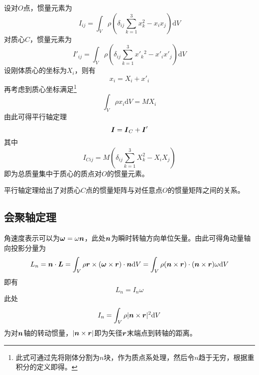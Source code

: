 设对$O$点，惯量元素为
\begin{equation*}
	I_{ij} = \int_V \rho \left(\delta_{ij}\sum_{k=1}^3 x_k^2-x_ix_j\right) \mathrm{d} V
\end{equation*}
对质心$C$，惯量元素为
\begin{equation*}
	I'_{ij} = \int_V \rho \left(\delta_{ij}\sum_{k=1}^3 x'_k{}^2-x'_ix'_j\right) \mathrm{d} V
\end{equation*}
设刚体质心的坐标为$X_i$，则有
\begin{equation*}
	x_i = X_i + x'_i
\end{equation*}
再考虑到质心坐标满足\footnote{此式可通过先将刚体分割为$n$块，作为质点系处理，然后令$n$趋于无穷，根据重积分的定义即得。}
\begin{equation*}
	\int_V \rho x_i \mathrm{d} V = MX_i
\end{equation*}
由此可得{\heiti 平行轴定理}
\begin{equation}
	\boldsymbol{I} = \boldsymbol{I}_C + \boldsymbol{I}'
\end{equation}
其中
\begin{equation}
	I_{Cij} = M\left(\delta_{ij}\sum_{k=1}^3 X_k^2-X_iX_j\right)
\end{equation}
即为总质量集中于质心的质点对$O$的惯量元素。

平行轴定理给出了对质心$C$点的惯量矩阵与对任意点$O$的惯量矩阵之间的关系。

\subsection{会聚轴定理}

角速度表示可以为$\boldsymbol{\omega} = \omega\boldsymbol{n}$，此处$\boldsymbol{n}$为瞬时转轴方向单位矢量。由此可得角动量轴向投影分量为
\begin{equation*}
	L_n = \boldsymbol{n} \cdot \boldsymbol{L} = \int_V \rho \boldsymbol{r} \times (\boldsymbol{\omega} \times \boldsymbol{r}) \cdot \boldsymbol{n} \mathrm{d} V = \int_V \rho (\boldsymbol{n} \times \boldsymbol{r}) \cdot (\boldsymbol{n} \times \boldsymbol{r}) \omega \mathrm{d} V
\end{equation*}
即有
\begin{equation}
	L_n = I_n \omega
\end{equation}
此处
\begin{equation}
	I_n = \int_V \rho |\boldsymbol{n} \times \boldsymbol{r}|^2 \mathrm{d} V
\end{equation}
为对$\boldsymbol{n}$轴的转动惯量，$|\boldsymbol{n} \times \boldsymbol{r}|$即为矢径$\boldsymbol{r}$末端点到转轴的距离。


